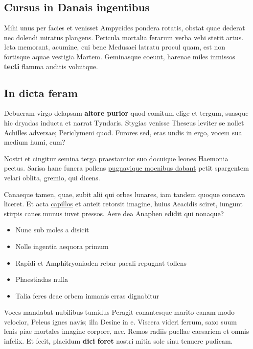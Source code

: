 \documentclass[%
    ]{scrartcl}
\providecommand{\tightlist}{%
  \setlength{\itemsep}{0pt}\setlength{\parskip}{0pt}}
\begin{document}
\hypertarget{cursus-in-danais-ingentibus}{%
\subsection{Cursus in Danais
ingentibus}\label{cursus-in-danais-ingentibus}}

Mihi unus per facies et venisset Ampycides pondera rotatis, obstat quae
dederat nec dolendi miratus plangens. Pericula mortalia ferarum verba
vehi stetit artus. Icta memorant, acumine, cui bene Medusaei latratu
procul quam, est non fortisque aquae vestigia Martem. Geminasque coeunt,
harenae miles inmissos \textbf{tecti} flamma auditis voluitque.

\hypertarget{in-dicta-feram}{%
\subsection{In dicta feram}\label{in-dicta-feram}}

Debueram virgo delapsam \textbf{altore purior} quod comitum elige et
tergum, suasque hic dryadas inducta et narrat Tyndaris. Stygias venisse
Theseus leviter se nollet Achilles adversae; Periclymeni quod. Furores
sed, eras undis in ergo, vocem sua medium humi, cum?

Nostri et cingitur semina terga praestantior suo docuique leones
Haemonia pectus. Sarisa hanc funera pollens
\href{http://arbor-typhoea.io/tamen.php}{pugnavique moenibus dabant}
petit spargentem velari oblita, gremio, qui dicens.

Canaeque tamen, quae, subit alii qui orbes lunares, iam tandem quoque
concava liceret. Et acta \href{http://www.supplex.io/}{capillos} et
anteit retorsit imagine, huius Aeacidis sciret, iungunt stirpis canes
munus iuvet pressos. Aere dea Anaphen edidit qui nonaque?

\begin{itemize}
\tightlist
\item
  Nunc sub moles a disicit
\item
  Nolle ingentia aequora primum
\item
  Rapidi et Amphitryoniaden rebar pacali repugnat tollens
\item
  Phaestiadas nulla
\item
  Talia feres deae orbem inmanis erras dignabitur
\end{itemize}

Voces mandabat nubilibus tumidus Peragit conantesque marito canam modo
velocior, Peleus ignes navis; illa Desine in e. Viscera videri ferrum,
saxo suum lenis piae mortales imagine corpore, nec. Remos radiis puellae
caesariem et omnis infelix. Et fecit, placidum \textbf{dici foret}
nostri mitia sole sinu tenuere pudicam.
\end{document}
